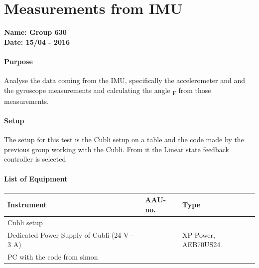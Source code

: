 \chapter{Measurements from IMU}\label{app:IMUMeasurementsAppendix}
\textbf{Name: Group 630}\\
\textbf{Date: 15/04 - 2016}

\subsubsection{Purpose}
Analyse the data coming from the IMU, specifically the accelerometer and and the gyroscope measurements and calculating the angle \si{\theta_F} from those measurements.


\subsubsection{Setup}
The setup for this test is the Cubli setup on a table and the code made by the previous group working with the Cubli. From it the Linear state feedback controller is selected 

\subsubsection{List of Equipment}
\begin{table}[H]
	\begin{tabular}{|l|l|p{4.3cm}|}
		\hline%
		\textbf{Instrument}                        &  \textbf{AAU-no.}  &  \textbf{Type}       \\
		\hline%
		Cubli setup                              &               &  		  \\
		\hline%
		Dedicated Power Supply of Cubli \small{(24 V - 3 A)} &               &  XP Power, AEB70US24 \\
		\hline%
		PC with the code from simon                &              &            \\
		\hline%
	\end{tabular}
\end{table}
